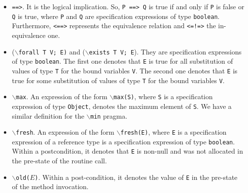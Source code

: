 \documentclass[a4paper]{llncs}
\begin{document}
\begin{itemize}
\item{\texttt{==>}.} It is the logical implication. So, \texttt{P
==> Q} is true if and only if \texttt{P} is false or \texttt{Q} is
true, where \texttt{P} and \texttt{Q} are specification expressions of
type \texttt{boolean}. Furthermore, \texttt{<==>} represents the
equivalence relation and \texttt{<=!=>} the in-equivalence one.

\item {($\backslash$\texttt{forall T V; E)} and
($\backslash$\texttt{exists T V; E}).}
They are specification expressions of type \texttt{boolean}. The first one
denotes that \texttt{E} is true for all substitution of values
of type \texttt{T} for the bound variables \texttt{V}. The second one
denotes that \texttt{E} is true for some substitution of values of
type \texttt{T} for the bound variables \texttt{V}.

\item {$\backslash$\texttt{max}.} An expression of the form
\texttt{$\backslash$max(S)}, where \texttt{S} is a specification
expression of type \texttt{Object}, denotes the maximum element of
\texttt{S}. We have a similar definition for the
$\backslash$\texttt{min} pragma.

\item{\texttt{$\backslash$fresh}.} An expression of the form
\texttt{$\backslash$fresh(E)}, where \texttt{E} is a specification
expression of a reference type is a specification expression of type
\texttt{boolean}. Within a postcondition, it denotes that \texttt{E}
is non-null and was not allocated in the pre-state of the routine
call.

\item{\texttt{$\backslash$old($E$)}.} Within a post-condition, it denotes
the value of \texttt{E} in the pre-state of the method invocation. %



\end{itemize}
\end{document}

